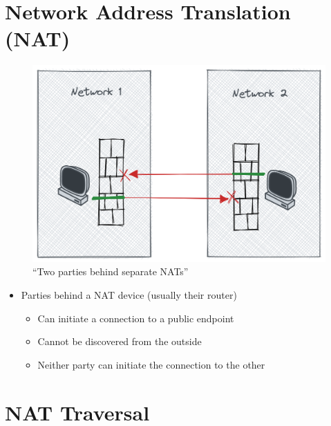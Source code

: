 \hypertarget{network-address-translation-nat}{%
\part{Network Address Translation
(NAT)}\label{network-address-translation-nat}}

\begin{figure}
\centering
\includegraphics[width=\textwidth,height=0.66\textheight]{presentation/../figures/nat-intro.png}
\caption{``Two parties behind separate NATs''\label{nat-intro}}
\end{figure}

\begin{itemize}
\tightlist
\item
  Parties behind a NAT device (usually their router)

  \begin{itemize}
  \tightlist
  \item
    Can initiate a connection to a public endpoint
  \item
    Cannot be discovered from the outside
  \item
    Neither party can initiate the connection to the other
  \end{itemize}
\end{itemize}

\hypertarget{nat-traversal}{%
\part{NAT Traversal}\label{nat-traversal}}

